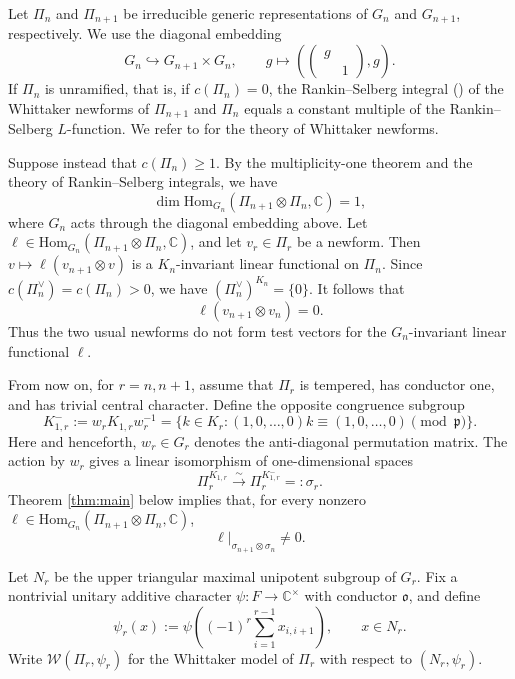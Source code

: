 \documentclass[11pt, a4paper]{amsart}
\newcommand{\CK}{{\mathcal {K}}}
\newcommand{\CW}{{\mathcal {W}}}
\newcommand{\Hom}{{\mathrm{Hom}}}
\newcommand{\p}{\frac{\partial\bar\partial}{\Pi i}}
\renewcommand{\p}{\mathfrak p}
\renewcommand{\o}{\mathfrak o}
\newcommand{\C}{\mathbb{C}}
\newcommand{\be}{\begin {equation}}
\newcommand{\ee}{\end {equation}}
\theoremstyle{plain}
\theoremstyle{plain}
\theoremstyle{plain}
\theoremstyle{plain}
\theoremstyle{remark}
\theoremstyle{definition}
\theoremstyle{plain}
\numberwithin{equation}{section}
\begin{document}
Let $\Pi_n$ and $\Pi_{n+1}$ be irreducible generic representations of
$G_n$ and $G_{n+1}$, respectively.  We use the diagonal embedding
\[
G_n \hookrightarrow G_{n+1}\times G_n,\qquad g \mapsto \left(\begin{pmatrix} g  \\ & 1\end{pmatrix}, g \right).
\]
If $\Pi_n$ is unramified, that is, if $c(\Pi_n)=0$, the 
Rankin--Selberg integral (\cite{JPSS}) of the Whittaker newforms of $\Pi_{n+1}$ and
$\Pi_n$ equals a constant multiple of the Rankin--Selberg $L$-function.  We refer to
\cite{JPSS81,J,Matringe,Miyauchi} for the theory of Whittaker
newforms.

Suppose instead that $c(\Pi_n)\geq1$.  By the multiplicity-one theorem
\cite{AGRS} and the theory of Rankin--Selberg integrals, we have
\[
\dim\Hom_{G_n}(\Pi_{n+1}\otimes\Pi_n,\C) =1,
\]
where $G_n$ acts through
the diagonal embedding above.  Let
$\ell\in\Hom_{G_n}(\Pi_{n+1}\otimes\Pi_n,\C)$, and let $v_r\in\Pi_r$ be a newform.
Then $v\mapsto\ell(v_{n+1}\otimes v)$ is a $K_n$-invariant linear
functional on $\Pi_n$.  Since $c(\Pi_n^\vee) = c(\Pi_n)>0$,  we have $(\Pi_n^\vee)^{K_n}=\{0\}$.  It follows that
\be \label{van}
\ell(v_{n+1}\otimes v_n)=0.
\ee
Thus the two usual newforms do not form  test vectors for the
$G_n$-invariant linear functional $\ell$.

From now on, for $r=n,n+1$, assume that $\Pi_r$ is tempered, has
conductor one, and has trivial central character.  Define the opposite
congruence subgroup
\[
 K_{1,r}^-:= w_r K_{1,r} w_r^{-1}
 =\{k\in K_r:(1,0,\ldots,0)k\equiv(1,0,\ldots,0)\pmod\p\}.
\]
Here and henceforth, $w_r\in G_r$ denotes the anti-diagonal permutation matrix.  
The action by $w_r$ gives a linear isomorphism of one-dimensional spaces
\[
\Pi_r^{K_{1,r}} \xrightarrow{\sim} \Pi_r^{K_{1,r}^-}=:\sigma_r.
\]
Theorem \ref{thm:main} below implies that, for every nonzero
$\ell\in\Hom_{G_n}(\Pi_{n+1}\otimes\Pi_n,\C)$,
\be \label{nonvanish}
\ell|_{\sigma_{n+1}\otimes \sigma_n} \neq 0.
\ee

Let $N_r$ be the upper triangular maximal unipotent subgroup of
$G_r$.  Fix a nontrivial unitary additive character
$\psi:F\to\C^\times$ with conductor $\o$, and define
\[
 \psi_r(x):=\psi\!\left((-1)^r\sum_{i=1}^{r-1}x_{i,i+1}\right),
 \qquad x\in N_r.
\]
Write $\CW(\Pi_r,\psi_r)$ for the Whittaker model of $\Pi_r$ with respect to
$(N_r,\psi_r)$.
\end{document}
